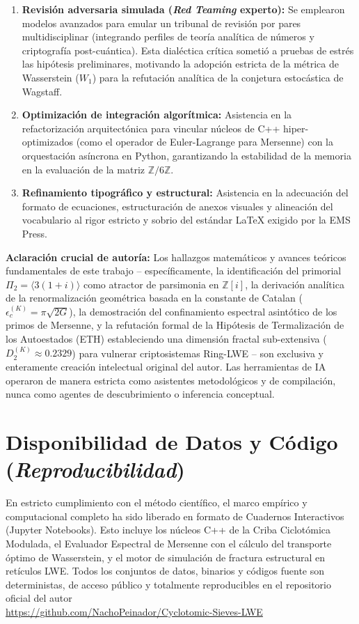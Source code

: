 \documentclass{article}
\numberwithin{equation}{section}
\theoremstyle{plain}
\theoremstyle{definition}
\begin{document}
\begin{enumerate}
    \item \textbf{Revisión adversaria simulada (\textit{Red Teaming} experto):} Se emplearon modelos avanzados para emular un tribunal de revisión por pares multidisciplinar (integrando perfiles de teoría analítica de números y criptografía post-cuántica). Esta dialéctica crítica sometió a pruebas de estrés las hipótesis preliminares, motivando la adopción estricta de la métrica de Wasserstein ($W_1$) para la refutación analítica de la conjetura estocástica de Wagstaff.
    \item \textbf{Optimización de integración algorítmica:} Asistencia en la refactorización arquitectónica para vincular núcleos de C++ hiper-optimizados (como el operador de Euler-Lagrange para Mersenne) con la orquestación asíncrona en Python, garantizando la estabilidad de la memoria en la evaluación de la matriz $\mathbb{Z}/6\mathbb{Z}$.
    \item \textbf{Refinamiento tipográfico y estructural:} Asistencia en la adecuación del formato de ecuaciones, estructuración de anexos visuales y alineación del vocabulario al rigor estricto y sobrio del estándar LaTeX exigido por la EMS Press.
\end{enumerate}

\textbf{Aclaración crucial de autoría:} Los hallazgos matemáticos y avances teóricos fundamentales de este trabajo -- específicamente, la identificación del primorial $\Pi_2 = \langle 3(1+i) \rangle$ como atractor de parsimonia en $\mathbb{Z}[i]$, la derivación analítica de la renormalización geométrica basada en la constante de Catalan ($\epsilon_c^{(K)} = \pi\sqrt{2G}$), la demostración del confinamiento espectral asintótico de los primos de Mersenne, y la refutación formal de la Hipótesis de Termalización de los Autoestados (ETH) estableciendo una dimensión fractal sub-extensiva ($D_2^{(K)} \approx 0.2329$) para vulnerar criptosistemas Ring-LWE -- son exclusiva y enteramente creación intelectual original del autor. Las herramientas de IA operaron de manera estricta como asistentes metodológicos y de compilación, nunca como agentes de descubrimiento o inferencia conceptual.

\section*{Disponibilidad de Datos y Código (\textit{Reproducibilidad})}
En estricto cumplimiento con el método científico, el marco empírico y computacional completo ha sido liberado en formato de Cuadernos Interactivos (Jupyter Notebooks). Esto incluye los núcleos C++ de la Criba Ciclotómica Modulada, el Evaluador Espectral de Mersenne con el cálculo del transporte óptimo de Wasserstein, y el motor de simulación de fractura estructural en retículos LWE. Todos los conjuntos de datos, binarios y códigos fuente son deterministas, de acceso público y totalmente reproducibles en el repositorio oficial del autor \\
\url{https://github.com/NachoPeinador/Cyclotomic-Sieves-LWE}
\end{document}
